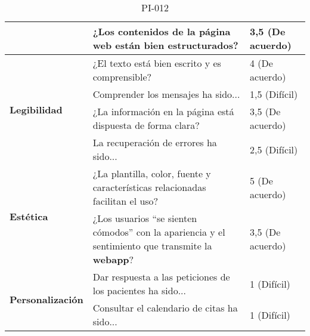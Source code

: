 \begin{table}[htpb]
\begin{tabularx}{\textwidth}{|l|X|l|}
                                          & ¿Los contenidos de la página web están bien estructurados?                                                          & 3,5 (De acuerdo)    \\ \hline
\multirow{4}{*}{\textbf{Legibilidad}}     & ¿El texto está bien escrito y es comprensible?                                                                      & 4 (De acuerdo)      \\ \cline{2-3} 
                                          & Comprender los mensajes ha sido...                                                                                  & 1,5 (Difícil)       \\ \cline{2-3} 
                                          & ¿La información en la página está dispuesta de forma clara?                                                         & 3,5 (De acuerdo)    \\ \cline{2-3} 
                                          & La recuperación de errores ha sido...                                                                               & 2,5 (Difícil)       \\ \hline
\multirow{2}{*}{\textbf{Estética}}        & ¿La plantilla, color, fuente y características relacionadas facilitan el uso?                                       & 5 (De acuerdo)      \\ \cline{2-3} 
                                          & ¿Los usuarios “se sienten cómodos” con la apariencia y el sentimiento que transmite la \textbf{webapp}?                      & 3,5 (De acuerdo)    \\ \hline
\multirow{2}{*}{\textbf{Personalización}} & Dar respuesta a las peticiones de los pacientes ha sido...                                                          & 1 (Difícil)         \\ \cline{2-3} 
                                          & Consultar el calendario de citas ha sido...                                                                         & 1 (Difícil)         \\ \hline
\end{tabularx}
\caption{PI-012}
\end{table}


